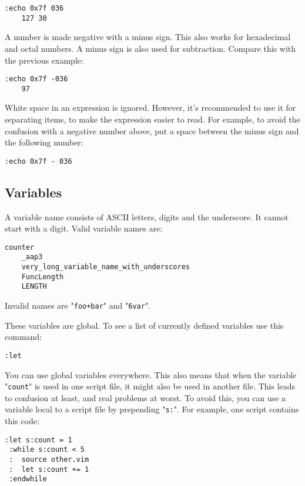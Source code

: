 \begin{Verbatim}[samepage=true]
 :echo 0x7f 036
    127 30
\end{Verbatim}

A number is made negative with a minus sign.
This also works for hexadecimal and octal numbers.
A minus sign is also used for subtraction.
Compare this with the previous example:

\begin{Verbatim}[samepage=true]
 :echo 0x7f -036
    97
\end{Verbatim}

White space in an expression is ignored.
However, it's recommended to use it for separating items, to make the expression easier to read.
For example, to avoid the confusion with a negative number above, put a space between the minus sign and the following number:

\begin{Verbatim}[samepage=true]
 :echo 0x7f - 036
\end{Verbatim}
\subsection{Variables}
A variable name consists of ASCII letters, digits and the underscore.
It cannot start with a digit.
Valid variable names are:

\begin{Verbatim}[samepage=true]
    counter
    _aap3
    very_long_variable_name_with_underscores
    FuncLength
    LENGTH
\end{Verbatim}

Invalid names are "\verb!foo+bar!" and "\verb!6var!".

These variables are global.
To see a list of currently defined variables use this command:

\begin{Verbatim}[samepage=true]
 :let
\end{Verbatim}

You can use global variables everywhere.
This also means that when the variable "\verb!count!" is used in one script file, it might also be used in another file.
This leads to confusion at least, and real problems at worst.
To avoid this, you can use a variable local to a script file by prepending "\verb!s:!".
For example, one script contains this code:

\begin{Verbatim}[samepage=true]
 :let s:count = 1
 :while s:count < 5
 :  source other.vim
 :  let s:count += 1
 :endwhile
\end{Verbatim}

